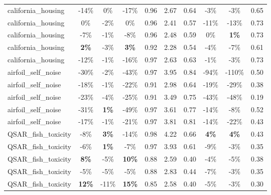 \begin{table}[!htbp]
\begin{small}
\begin{sc}
{\begin{tabular}{lccccccccc}
california\_housing & -14\% & 0\% & -17\% & 0.96 & 2.67 & 0.64 & -3\% & -3\% & 0.65 \\
california\_housing & 0\% & -2\% & 0\% & 0.96 & 2.41 & 0.57 & -11\% & -13\% & 0.73 \\
california\_housing & -7\% & -1\% & -8\% & 0.96 & 2.48 & 0.59 & 0\% & \textbf{1\%} & 0.73 \\
california\_housing & \textbf{2\%} & -3\% & \textbf{3\%} & 0.92 & 2.28 & 0.54 & -4\% & -7\% & 0.61 \\
california\_housing & -12\% & -1\% & -16\% & 0.97 & 2.63 & 0.63 & -1\% & -3\% & 0.73 \\
airfoil\_self\_noise & -30\% & -2\% & -43\% & 0.97 & 3.95 & 0.84 & -94\% & -110\% & 0.50 \\
airfoil\_self\_noise & -18\% & -1\% & -22\% & 0.91 & 2.98 & 0.64 & -19\% & -29\% & 0.38 \\
airfoil\_self\_noise & -23\% & -4\% & -25\% & 0.91 & 3.49 & 0.75 & -43\% & -48\% & 0.19 \\
airfoil\_self\_noise & -31\% & \textbf{1\%} & -49\% & 0.97 & 3.61 & 0.77 & -14\% & -8\% & 0.52 \\
airfoil\_self\_noise & -17\% & -1\% & -21\% & 0.97 & 3.81 & 0.81 & -14\% & -22\% & 0.43 \\
QSAR\_fish\_toxicity & -8\% & \textbf{3\%} & -14\% & 0.98 & 4.22 & 0.66 & \textbf{4\%} & \textbf{4\%} & 0.43 \\
QSAR\_fish\_toxicity & -6\% & \textbf{1\%} & -7\% & 0.97 & 3.93 & 0.61 & -9\% & -3\% & 0.35 \\
QSAR\_fish\_toxicity & \textbf{8\%} & -5\% & \textbf{10\%} & 0.88 & 2.59 & 0.40 & -4\% & -5\% & 0.38 \\
QSAR\_fish\_toxicity & -5\% & -5\% & -5\% & 0.88 & 2.83 & 0.44 & -7\% & -3\% & 0.35 \\
QSAR\_fish\_toxicity & \textbf{12\%} & -11\% & \textbf{15\%} & 0.85 & 2.58 & 0.40 & -5\% & -3\% & 0.30 \\
\bottomrule
\end{tabular}
}
\end{sc}
\end{small}
\end{table}
